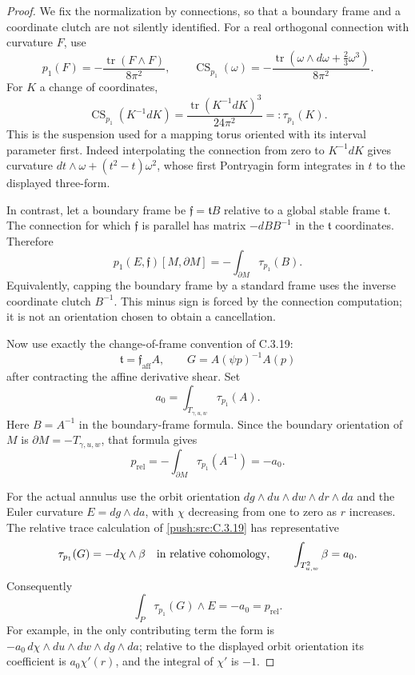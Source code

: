 \begin{proof}
We fix the normalization by connections, so that a boundary
frame and a coordinate clutch are not silently identified.
For a real orthogonal connection with curvature $F$, use
\[
 p_1(F)=-\frac{\operatorname{tr}(F\wedge F)}{8\pi^2},
 \qquad
 \operatorname{CS}_{p_1}(\omega)
 =-\frac{\operatorname{tr}(\omega\wedge d\omega
                          +\tfrac23\omega^3)}{8\pi^2}.
\]
For $K$ a change of coordinates,
\[
 \operatorname{CS}_{p_1}(K^{-1}dK)
 =\frac{\operatorname{tr}(K^{-1}dK)^3}{24\pi^2}
 =:\tau_{p_1}(K).
\]
This is the suspension used for a mapping torus oriented
with its interval parameter first. Indeed interpolating
the connection from zero to $K^{-1}dK$ gives curvature
$dt\wedge\omega+(t^2-t)\omega^2$, whose first Pontryagin
form integrates in $t$ to the displayed three-form.

In contrast, let a boundary frame be
$\mathfrak f=\mathfrak t B$ relative to a global stable
frame $\mathfrak t$. The connection for which
$\mathfrak f$ is parallel has matrix $-dB B^{-1}$ in
the $\mathfrak t$ coordinates. Therefore
\[
 p_1(E,\mathfrak f)[M,\partial M]
 =-\int_{\partial M}\tau_{p_1}(B).
\]
Equivalently, capping the boundary frame by a standard
frame uses the inverse coordinate clutch $B^{-1}$.
This minus sign is forced by the connection computation;
it is not an orientation chosen to obtain a cancellation.

Now use exactly the change-of-frame convention of C.3.19:
\[
 \mathfrak t=\mathfrak f_{\mathrm{aff}} A,
 \qquad
 G=A(\psi p)^{-1}A(p)
\]
after contracting the affine derivative shear. Set
\[
 a_0=\int_{T_{\gamma,u,w}}\tau_{p_1}(A).
\]
Here $B=A^{-1}$ in the boundary-frame formula. Since
the boundary orientation of $M$ is
$\partial M=-T_{\gamma,u,w}$, that formula gives
\[
 p_{\mathrm{rel}}
 =-\int_{\partial M}\tau_{p_1}(A^{-1})
 =-a_0.
\]

For the actual annulus use the orbit orientation
$dg\wedge du\wedge dw\wedge dr\wedge da$ and the
Euler curvature $E=dg\wedge da$, with $\chi$ decreasing
from one to zero as $r$ increases. The relative trace
calculation of \ref{push:src:C.3.19} has representative
\[
 \tau_{p_1}(G)
 =-d\chi\wedge\beta
 \quad\hbox{in relative cohomology},
 \qquad
 \int_{T^2_{u,w}}\beta=a_0.
\]
Consequently
\[
 \int_P\tau_{p_1}(G)\wedge E=-a_0=p_{\mathrm{rel}}.
\]
For example, in the only contributing term the form is
$-a_0\,d\chi\wedge du\wedge dw\wedge dg\wedge da$;
relative to the displayed orbit orientation its coefficient
is $a_0\chi'(r)$, and the integral of $\chi'$ is $-1$.


\end{proof}
